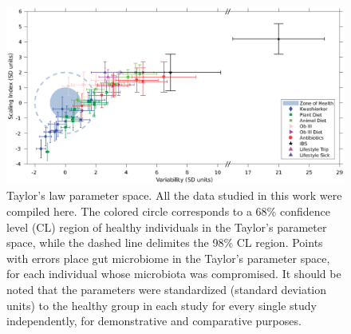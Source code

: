 \begin{figure}
	\centering
	\includegraphics[width=1.0\textwidth]{figs/Fig2.eps}
	\caption{Taylor's law parameter space. All the data studied in this work were compiled here. The colored circle corresponds to a 68\% confidence level (CL) region of healthy individuals in the Taylor's parameter space, while the dashed line delimites the 98\% CL region. Points with errors place gut microbiome in the Taylor's parameter space, for each individual whose microbiota was compromised. It should be noted that the parameters were standardized (standard deviation units) to the healthy group in each study for every single study independently, for demonstrative and comparative purposes.}
	\label{fig:main2}
\end{figure}

